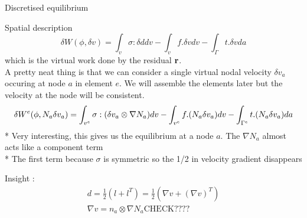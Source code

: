 	\begin{frame}{Discretised equilibrium}
		\begin{block}{Spatial description}
			\begin{equation}
				\delta W(\phi,\delta v) = \int_v \sigma : \delta d dv - \int_v f. \delta v dv - \int_{\Gamma} t. \delta v da
			\end{equation}
			which is the virtual work done by the residual $\mathbf{r}$. \\
			A pretty neat thing is that we can consider a single virtual nodal velocity $\delta v_a$ occuring at node $a$ in element $e$. We will assemble the elements later but the velocity at the node will be consistent.
			\begin{equation}
			\delta W^e(\phi,N_a\delta v_a) =  \int_{v^e} \mathbf{\sigma} : (\delta v_a \otimes \nabla N_a) dv - \int_{v^e} f. (N_a \delta v_a) dv - \int_{\Gamma^e} t. (N_a \delta v_a)da
			\end{equation}
			* Very interesting, this gives us the equilibrium at a node $a$. The $\nabla N_a$ almost acts like a component term  \\
			* The first term because $\sigma$ is symmetric so the 1/2 in velocity gradient disappears\\
		\end{block}
	
		Insight :
		\begin{equation}
			\begin{aligned}
			d = \frac{1}{2}\left(l  + l^T \right) = \frac{1}{2}\left(\nabla v + (\nabla v)^T \right) \\
			\nabla v = n_a \otimes \nabla N_a \text{CHECK????}
			\end{aligned}
		\end{equation}
	\end{frame}


